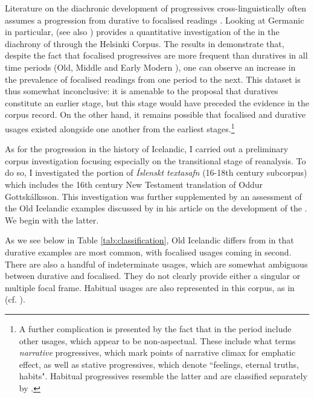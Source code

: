 \documentclass[output=paper,colorlinks,citecolor=brown]{langscibook}
\begin{document}
Literature on the diachronic development of progressives  cross-linguistically often assumes a progression from durative to focalised readings \citep{bertinetto2000progressive, bertinetto2000progressive2}. Looking at Germanic in particular, \citet{killie2014development} (see also \cite{Killie2008}) provides a quantitative investigation of the   in the diachrony of  through the Helsinki Corpus. The results in \citet{killie2014development} demonstrate that, despite the fact that focalised progressives are more frequent than duratives in all time periods (Old, Middle and Early Modern ), one can observe an increase in the prevalence of focalised readings from one period to the next. This dataset is thus somewhat inconclusive: it is amenable to the proposal that duratives constitute an earlier stage, but this stage would have preceded the evidence in the corpus record. On the other hand, it remains possible that focalised and durative usages existed alongside one another from the earliest stages.\footnote{A further complication is presented by the fact that in the  period include other usages, which appear to be non-aspectual. These include what \citet{Killie2008} terms \textit{narrative} progressives, which mark points of narrative climax for emphatic effect, as well as stative progressives, which denote ``feelings, eternal truths, habits". Habitual progressives resemble the latter and are classified separately by \citet{Killie2008}.}

As for the progression in the history of Icelandic, I carried out a preliminary corpus investigation focusing especially on the transitional stage of reanalysis. To do so, I investigated the portion of \textit{Íslenskt textasafn} (16-18th century subcorpus) which includes the 16th century New Testament translation of Oddur Gottskálksson. This investigation was further supplemented by an assessment of the Old Icelandic examples discussed by \citet{benediktsson1976isl} in his article on the development of the . We begin with the latter. 

As we see below in Table \ref{tab:classification}, Old Icelandic differs from  in that durative examples are most common, with focalised usages coming in second. There are also a handful of indeterminate usages, which are somewhat ambiguous between durative and focalised. They do not clearly provide either a singular or multiple focal frame. Habitual usages are also represented in this corpus, as in  (cf. \citeauthor{Killie2008} \citeyear{Killie2008}).
\end{document}
